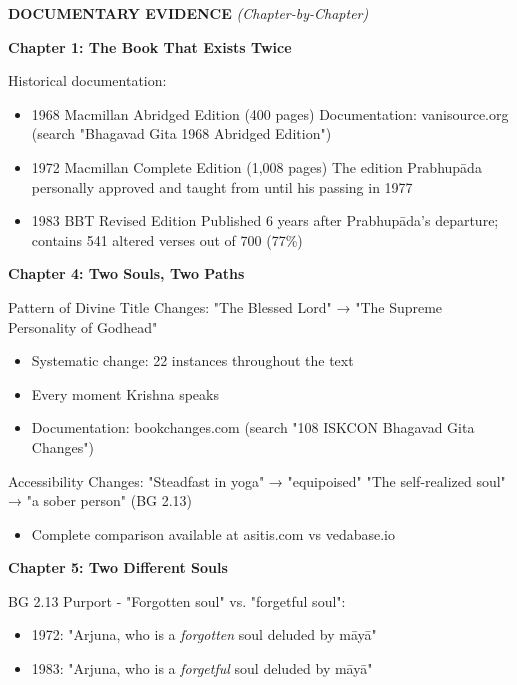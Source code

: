 \documentclass[12pt,twoside]{book}
\begin{document}
\vspace{0.5cm}

\textbf{\textbf{DOCUMENTARY EVIDENCE}} \emph{(Chapter-by-Chapter)}

\vspace{0.1cm}

\textbf{\textbf{Chapter 1: The Book That Exists Twice}}

Historical documentation:
\begin{itemize}
\item 1968 Macmillan Abridged Edition (400 pages)
Documentation: vanisource.org (search "Bhagavad Gita 1968 Abridged Edition")
\item 1972 Macmillan Complete Edition (1,008 pages)
The edition Prabhupāda personally approved and taught from until his passing in 1977
\item 1983 BBT Revised Edition
Published 6 years after Prabhupāda's departure; contains 541 altered verses out of 700 (77\%)
\end{itemize}

\vspace{0.1cm}

\textbf{\textbf{Chapter 4: Two Souls, Two Paths}}

Pattern of Divine Title Changes:
"The Blessed Lord" → "The Supreme Personality of Godhead"
\begin{itemize}
\item Systematic change: 22 instances throughout the text
\item Every moment Krishna speaks
\item Documentation: bookchanges.com (search "108 ISKCON Bhagavad Gita Changes")
\end{itemize}

Accessibility Changes:
"Steadfast in yoga" → "equipoised"
"The self-realized soul" → "a sober person" (BG 2.13)
\begin{itemize}
\item Complete comparison available at asitis.com vs vedabase.io
\end{itemize}

\vspace{0.5cm}

\textbf{\textbf{Chapter 5: Two Different Souls}}

BG 2.13 Purport - "Forgotten soul" vs. "forgetful soul":
\begin{itemize}
\item 1972: "Arjuna, who is a \emph{forgotten} soul deluded by māyā"
\item 1983: "Arjuna, who is a \emph{forgetful} soul deluded by māyā"
\end{itemize}
\end{document}
